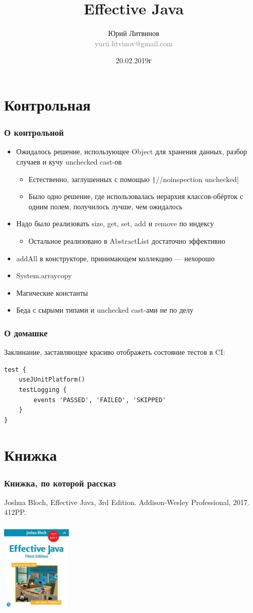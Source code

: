 \documentclass[xetex,mathserif,serif]{beamer}
\title{Effective Java}
\author[Юрий Литвинов]{Юрий Литвинов\\\small{\textcolor{gray}{yurii.litvinov@gmail.com}}}
\date{20.02.2019г}
\begin{document}
	\frame{\titlepage}

	\section{Контрольная}

	\begin{frame}
		\frametitle{О контрольной}
		\begin{itemize}
			\item Ожидалось решение, использующее Object для хранения данных, разбор случаев и кучу unchecked cast-ов
			\begin{itemize}
				\item Естественно, заглушенных с помощью \texttt|//noinspection unchecked|
				\item Было одно решение, где использовалась иерархия классов-обёрток с одним полем, получилось лучше, чем ожидалось
			\end{itemize}
			\item Надо было реализовать size, get, set, add и remove по индексу
			\begin{itemize}
				\item Остальное реализовано в AbstractList достаточно эффективно
			\end{itemize}
			\item addAll в конструкторе, принимающем коллекцию --- нехорошо
			\item System.arraycopy
			\item Магические константы
			\item Беда с сырыми типами и unchecked cast-ами не по делу
		\end{itemize}
	\end{frame}

	\begin{frame}[fragile]
		\frametitle{О домашке}
		Заклинание, заставляющее красиво отображеть состояние тестов в CI:
		\begin{verbatim}
test {
    useJUnitPlatform()
    testLogging {
        events 'PASSED', 'FAILED', 'SKIPPED'
    }
}
		\end{verbatim}
	\end{frame}

	\section{Книжка}

	\begin{frame}
		\frametitle{Книжка, по которой рассказ}
		Joshua Bloch, Effective Java, 3rd Edition. Addison-Wesley Professional, 2017. 412PP.
		\begin{center}
			\includegraphics[width=0.25\textwidth]{bookCover.png}
		\end{center}
	\end{frame}
\end{document}
